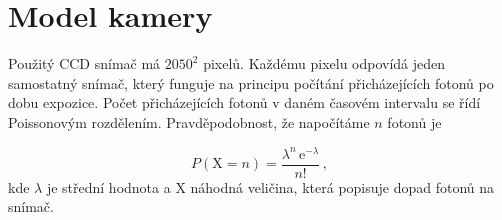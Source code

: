 \section{Model kamery}
\label{sec:poisson}
 Použitý CCD snímač má $2050^2$ pixelů. Každému pixelu odpovídá jeden samostatný snímač, který funguje na principu počítání přicházejících fotonů po dobu expozice. Počet přicházejících fotonů v daném časovém intervalu se řídí Poissonovým rozdělením. Pravděpodobnost, že napočítáme $n$ fotonů je 
 
 \begin{equation}
    P(\mathrm{X} = n)=\frac{\lambda ^{n}\,\mathrm{e}^{-\lambda}}{n!}\,,
 \end{equation}
 kde $\lambda$ je střední hodnota a $\mathrm{X}$ náhodná veličina, která popisuje dopad fotonů na snímač. 

\clearpage







